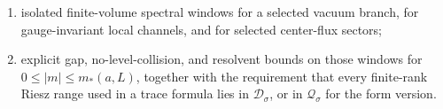 \begin{definition}
\begin{enumerate}[label=(\roman*)]
  \begin{equation}
    \mathcal V_{a,L}^{\sigma}(m)=\partial_m H_{a,L}^{\sigma}(m),
    \label{eq:soft-mass-perturbing-operator}
  \end{equation}
  whose bare representative is the spatial integral of
  \(S|_{\theta=0}+\overline S|_{\overline\theta=0}\) plus the required
  contact and counterterm derivatives, all satisfying the same relative or
  form bounds as the complete derivative;
\item isolated finite-volume spectral windows for a selected vacuum branch,
  for gauge-invariant local channels, and for selected center-flux sectors;
\item explicit gap, no-level-collision, and resolvent bounds on those windows
  for \(0\le |m|\le m_\ast(a,L)\), together with the requirement that every
  finite-rank Riesz range used in a trace formula lies in
  \(\mathcal D_{\sigma}\), or in \(\mathcal Q_{\sigma}\) for the form
  version.
\end{enumerate}
\end{definition}


